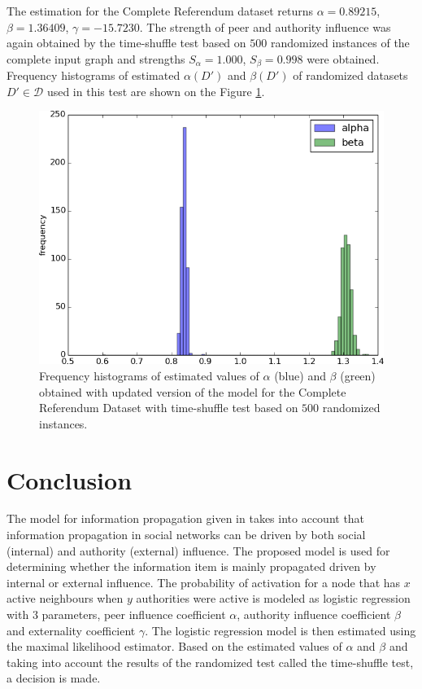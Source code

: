 \documentclass[times, utf8, zavrsni]{fer}
\begin{document}
The estimation for the Complete Referendum dataset returns $\alpha=0.89215$, $\beta=1.36409$, $\gamma=-15.7230$. The strength of peer and authority influence was again obtained by the time-shuffle test based on $500$ randomized instances of the complete input graph and strengths $S_{\alpha} = 1.000$, $S_{\beta} = 0.998$ were obtained. Frequency histograms of estimated $\alpha(D')$ and $\beta(D')$ of randomized datasets $D' \in \mathcal{D}$ used in this test are shown on the Figure \ref{hist_full3}. 
\begin{figure}[htp]
\centering
\includegraphics[scale=0.7]{figs/abg500v.png}	
\caption{Frequency histograms of estimated values of $\alpha$ (blue) and $\beta$ (green)  obtained with updated version of the model for the Complete Referendum Dataset with time-shuffle test based on $500$ randomized instances.}
\label{hist_full3}
\end{figure}

\chapter{Conclusion}

The model for information propagation given in \cite{authority} takes into account that information propagation in social networks can be driven by both social (internal) and authority (external) influence. The proposed model is used for determining whether the information item is mainly propagated driven by internal or external influence. The probability of activation for a node that has $x$ active neighbours when $y$ authorities were active is modeled as logistic regression with $3$ parameters, peer influence coefficient $\alpha$, authority influence coefficient $\beta$ and externality coefficient $\gamma$. The logistic regression model is then estimated using the maximal likelihood estimator. Based on the estimated values of $\alpha$ and $\beta$ and  taking into account the results of the randomized test called the time-shuffle test, a decision is made. 
\end{document}
